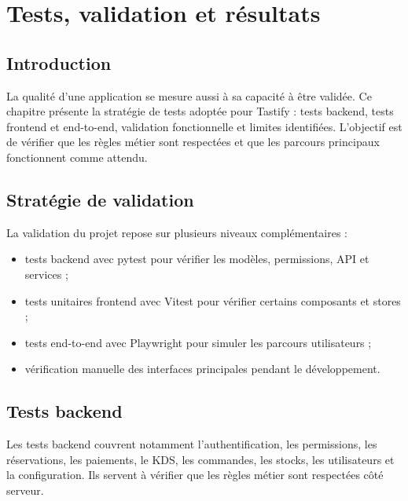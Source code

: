 \chapter{Tests, validation et résultats}

\section*{Introduction}
La qualité d'une application se mesure aussi à sa capacité à être validée. Ce chapitre présente la stratégie de tests adoptée pour Tastify : tests backend, tests frontend et end-to-end, validation fonctionnelle et limites identifiées. L'objectif est de vérifier que les règles métier sont respectées et que les parcours principaux fonctionnent comme attendu.

\section{Stratégie de validation}
La validation du projet repose sur plusieurs niveaux complémentaires :

\begin{itemize}[leftmargin=1.2cm]
  \item tests backend avec pytest pour vérifier les modèles, permissions, API et services ;
  \item tests unitaires frontend avec Vitest pour vérifier certains composants et stores ;
  \item tests end-to-end avec Playwright pour simuler les parcours utilisateurs ;
  \item vérification manuelle des interfaces principales pendant le développement.
\end{itemize}

\section{Tests backend}
Les tests backend couvrent notamment l'authentification, les permissions, les réservations, les paiements, le KDS, les commandes, les stocks, les utilisateurs et la configuration. Ils servent à vérifier que les règles métier sont respectées côté serveur.

